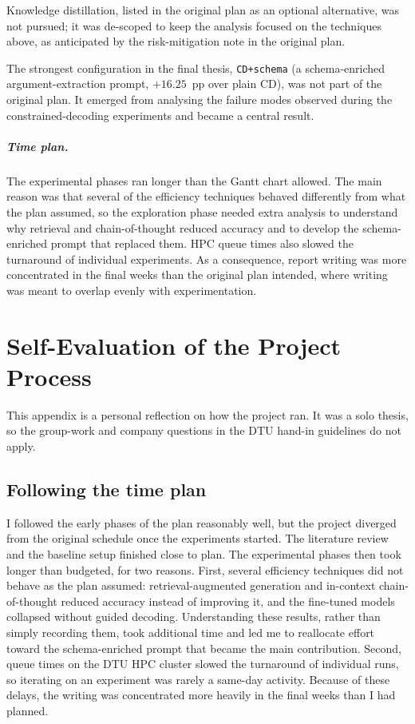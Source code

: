 Knowledge distillation, listed in the original plan as an optional
alternative, was not pursued; it was de-scoped to keep the analysis
focused on the techniques above, as anticipated by the risk-mitigation
note in the original plan.

The strongest configuration in the final thesis, \texttt{CD+schema}
(a schema-enriched argument-extraction prompt, $+16.25$~pp over plain
CD), was not part of the original plan. It emerged from analysing the
failure modes observed during the constrained-decoding experiments and
became a central result.

\paragraph{Time plan.}
The experimental phases ran longer than the Gantt chart allowed. The main
reason was that several of the efficiency techniques behaved differently
from what the plan assumed, so the exploration phase needed extra analysis
to understand why retrieval and chain-of-thought reduced accuracy and to
develop the schema-enriched prompt that replaced them. HPC queue times also
slowed the turnaround of individual experiments. As a consequence, report
writing was more concentrated in the final weeks than the original plan
intended, where writing was meant to overlap evenly with experimentation.

\chapter{Self-Evaluation of the Project Process}
\label{app:self-evaluation}

This appendix is a personal reflection on how the project ran. It was a
solo thesis, so the group-work and company questions in the DTU hand-in
guidelines do not apply.

\section{Following the time plan}

I followed the early phases of the plan reasonably well, but the project
diverged from the original schedule once the experiments started. The
literature review and the baseline setup finished close to plan. The
experimental phases then took longer than budgeted, for two reasons.
First, several efficiency techniques did not behave as the plan assumed:
retrieval-augmented generation and in-context chain-of-thought reduced
accuracy instead of improving it, and the fine-tuned models collapsed
without guided decoding. Understanding these results, rather than simply
recording them, took additional time and led me to reallocate effort
toward the schema-enriched prompt that became the main contribution.
Second, queue times on the DTU HPC cluster slowed the turnaround of
individual runs, so iterating on an experiment was rarely a same-day
activity. Because of these delays, the writing was concentrated more
heavily in the final weeks than I had planned.

